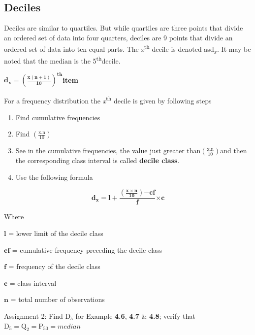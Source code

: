 \documentclass[
]{book}
\begin{document}
\hypertarget{deciles}{%
\subsection{Deciles}\label{deciles}}

Deciles are similar to quartiles. But while quartiles are three points
that divide an ordered set of data into four quarters, deciles are 9
points that divide an ordered set of data into ten equal parts. The
\emph{x}\textsuperscript{th} decile is denoted as\(\text{d}_{x}\). It may be noted that the
median is the 5\textsuperscript{th}decile.

\(\mathbf{d}_{\mathbf{x}}\mathbf{=}\left( \frac{\mathbf{x}\left( \mathbf{n + 1} \right)}{\mathbf{10}} \right)^{\mathbf{\text{th}}}\)\textbf{item}

For a frequency distribution the \emph{x}\textsuperscript{th} decile is given by following
steps

\begin{enumerate}
\def\labelenumi{\arabic{enumi}.}
\item
  Find cumulative frequencies
\item
  Find \(\left( \frac{\text{x.n}}{10} \right)\)
\item
  See in the cumulative frequencies, the value just greater
  than\(\left( \frac{\text{x.n}}{10} \right)\)and then the corresponding
  class interval is called \textbf{decile class}.
\item
  Use the following formula
\end{enumerate}

\[\mathbf{d}_{\mathbf{x}}\mathbf{= l +}\frac{\left( \frac{\mathbf{x \times n}}{\mathbf{10}} \right)\mathbf{- cf}}{\mathbf{f}}\mathbf{\times c}\]

Where

\(\mathbf{l}\) = lower limit of the decile class

\(\mathbf{\text{cf}}\) = cumulative frequency preceding the decile class

\(\mathbf{f}\) = frequency of the decile class

\(\mathbf{c}\) = class interval

\(\mathbf{n}\) = total number of observations

\begin{rmdnote}
Assignment 2: Find \(\text{D}_{5}\) for Example \textbf{4.6}, \textbf{4.7} \&
\textbf{4.8}; verify that
\(\text{D}_{5} = \text{Q}_{2} = \text{P}_{50} = median\)
\end{rmdnote}
\end{document}
